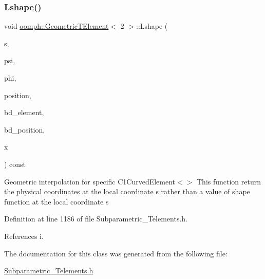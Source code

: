 \subsubsection{\texorpdfstring{Lshape()}{Lshape()}}
{\footnotesize\ttfamily void \hyperlink{classoomph_1_1GeometricTElement}{oomph\+::\+Geometric\+T\+Element}$<$ 2 $>$\+::Lshape (\begin{DoxyParamCaption}\item[{const \hyperlink{classoomph_1_1Vector}{Vector}$<$ double $>$ \&}]{s,  }\item[{\hyperlink{classoomph_1_1Shape}{Shape} \&}]{psi,  }\item[{\hyperlink{classoomph_1_1Shape}{Shape} \&}]{phi,  }\item[{\hyperlink{classoomph_1_1DenseMatrix}{Dense\+Matrix}$<$ double $>$ \&}]{position,  }\item[{unsigned \&}]{bd\+\_\+element,  }\item[{\hyperlink{classoomph_1_1DenseMatrix}{Dense\+Matrix}$<$ double $>$ \&}]{bd\+\_\+position,  }\item[{\hyperlink{classoomph_1_1Vector}{Vector}$<$ double $>$ \&}]{x }\end{DoxyParamCaption}) const\hspace{0.3cm}{\ttfamily [inline]}}

Geometric interpolation for specific C1\+Curved\+Element$<$$>$ This function return the physical coordinates at the local coordinate s rather than a value of shape function at the local coordinate s 

Definition at line 1186 of file Subparametric\+\_\+\+Telements.\+h.



References i.



The documentation for this class was generated from the following file\+:\begin{DoxyCompactItemize}
\item 
\hyperlink{Subparametric__Telements_8h}{Subparametric\+\_\+\+Telements.\+h}\end{DoxyCompactItemize}
